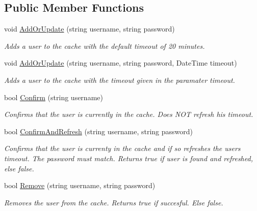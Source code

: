 \subsection*{Public Member Functions}
\begin{DoxyCompactItemize}
\item 
void \mbox{\hyperlink{interface_application_1_1_interfaces_1_1_i_user_cache_a607deb5ebf1cfb0f237daf9981206d73}{Add\+Or\+Update}} (string username, string password)
\begin{DoxyCompactList}\small\item\em Adds a user to the cache with the default timeout of 20 minutes. \end{DoxyCompactList}\item 
void \mbox{\hyperlink{interface_application_1_1_interfaces_1_1_i_user_cache_aec631e3f0e466a067018b3196457056a}{Add\+Or\+Update}} (string username, string password, Date\+Time timeout)
\begin{DoxyCompactList}\small\item\em Adds a user to the cache with the timeout given in the paramater timeout. \end{DoxyCompactList}\item 
bool \mbox{\hyperlink{interface_application_1_1_interfaces_1_1_i_user_cache_a4978aad56d7292eafa02e8e7ad66f2c2}{Confirm}} (string username)
\begin{DoxyCompactList}\small\item\em Confirms that the user is currently in the cache. Does N\+OT refresh his timeout. \end{DoxyCompactList}\item 
bool \mbox{\hyperlink{interface_application_1_1_interfaces_1_1_i_user_cache_a3516a7abf1f40f9ddd10243cad03bb65}{Confirm\+And\+Refresh}} (string username, string password)
\begin{DoxyCompactList}\small\item\em Confirms that the user is currenty in the cache and if so refreshes the user\textquotesingle{}s timeout. The password must match. Returns true if user is found and refreshed, else false. \end{DoxyCompactList}\item 
bool \mbox{\hyperlink{interface_application_1_1_interfaces_1_1_i_user_cache_ac8ccbf20ac25069528e1e5117d5481ee}{Remove}} (string username, string password)
\begin{DoxyCompactList}\small\item\em Removes the user from the cache. Returns true if succesful. Else false. \end{DoxyCompactList}\end{DoxyCompactItemize}
